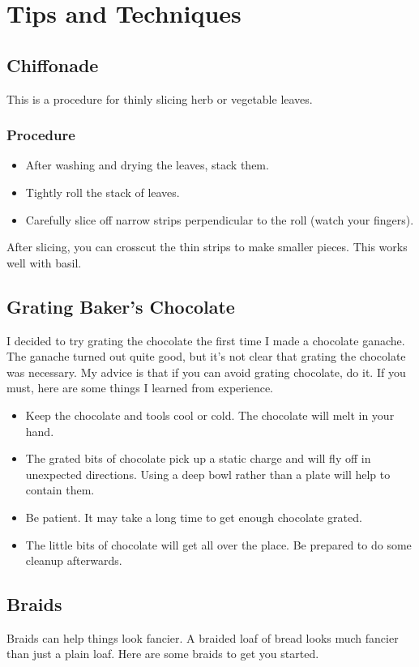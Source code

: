\documentclass[10pt, openany]{book}
\begin{document}
\chapter{Tips and Techniques}

\section{Chiffonade}
\label{tip:Chiffonade}
This is a procedure for thinly slicing herb or vegetable leaves.
\subsection{Procedure}
\begin{itemize}
  \item After washing and drying the leaves, stack them.
  \item Tightly roll the stack of leaves.
  \item Carefully slice off narrow strips perpendicular to the roll (watch your fingers).
\end{itemize}
After slicing, you can crosscut the thin strips to make smaller pieces.  This works well with basil.

\section{Grating Baker's Chocolate}
\label{tip:GrateChocolate}
I decided to try grating the chocolate the first time I made a chocolate ganache.  The ganache turned out quite good, but it's not clear that grating the chocolate was necessary.  My advice is that if you can avoid grating chocolate, do it.  If you must, here are some things I learned from experience.
\begin{itemize}
  \item Keep the chocolate and tools cool or cold.  The chocolate will melt in your hand.
  \item The grated bits of chocolate pick up a static charge and will fly off in unexpected directions.  Using a deep bowl rather than a plate will help to contain them.
  \item Be patient.  It may take a long time to get enough chocolate grated.
  \item The little bits of chocolate will get all over the place.  Be prepared to do some cleanup afterwards.
\end{itemize}

\section{Braids}
\label{tip:Braid}
Braids can help things look fancier.  A braided loaf of bread looks much fancier than just a plain loaf.  Here are some braids to get you started.
\end{document}
